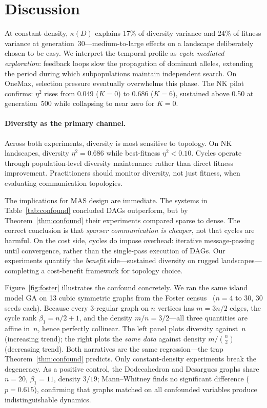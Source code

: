 \documentclass{llncs}
\begin{document}
\section{Discussion}
\label{sec:discussion}

At constant density, $\kappa(D)$ explains 17\% of diversity variance and 24\%
of fitness variance at generation~30---medium-to-large effects on a landscape
deliberately chosen to be easy. We interpret the temporal profile as
\emph{cycle-mediated exploration}: feedback loops slow the propagation of
dominant alleles, extending the period during which subpopulations maintain
independent search. On OneMax, selection pressure eventually overwhelms this
phase. The NK pilot confirms: $\eta^2$ rises from 0.049 ($K = 0$) to 0.686
($K = 6$), sustained above 0.50 at generation~500 while collapsing to near
zero for $K = 0$.

\paragraph{Diversity as the primary channel.}
Across both experiments, diversity is most sensitive to topology. On NK
landscapes, diversity $\eta^2 = 0.686$ while best-fitness $\eta^2 < 0.10$.
Cycles operate through population-level diversity maintenance rather than direct
fitness improvement. Practitioners should monitor diversity, not just fitness,
when evaluating communication topologies.

The implications for MAS design are immediate. The systems in
Table~\ref{tab:confound} concluded DAGs outperform, but by
Theorem~\ref{thm:confound} their experiments compared sparse to dense. The
correct conclusion is that \emph{sparser communication is cheaper}, not that
cycles are harmful. On the cost side, cycles do impose overhead: iterative
message-passing until convergence, rather than the single-pass execution of
DAGs. Our experiments quantify the \emph{benefit} side---sustained diversity on
rugged landscapes---completing a cost-benefit framework for topology choice.

Figure~\ref{fig:foster} illustrates the confound concretely. We ran the
same island model GA on 13 cubic symmetric graphs from the Foster
census~\cite{foster1988census} ($n = 4$ to $30$, 30 seeds each). Because
every 3-regular graph on $n$ vertices has $m = 3n/2$ edges, the cycle
rank $\beta_1 = n/2 + 1$, and the density $m/n = 3/2$---all three
quantities are affine in~$n$, hence perfectly collinear. The left panel
plots diversity against~$n$ (increasing trend); the right plots the
\emph{same data} against density $m/\binom{n}{2}$ (decreasing trend).
Both narratives are the same regression---the trap
Theorem~\ref{thm:confound} predicts. Only constant-density experiments
break the degeneracy. As a positive control, the Dodecahedron and Desargues
graphs share $n = 20$, $\beta_1 = 11$, density $3/19$; Mann--Whitney finds no
significant difference ($p = 0.615$), confirming that graphs matched on all
confounded variables produce indistinguishable dynamics.
\end{document}
